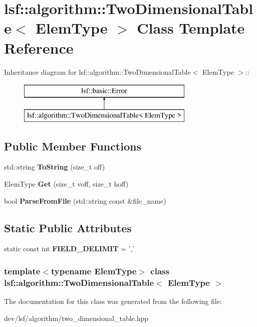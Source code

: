 \hypertarget{classlsf_1_1algorithm_1_1TwoDimensionalTable}{
\section{lsf::algorithm::TwoDimensionalTable$<$ ElemType $>$ Class Template Reference}
\label{classlsf_1_1algorithm_1_1TwoDimensionalTable}
}
Inheritance diagram for lsf::algorithm::TwoDimensionalTable$<$ ElemType $>$::\begin{figure}[H]
\begin{center}
\leavevmode
\includegraphics[height=2cm]{classlsf_1_1algorithm_1_1TwoDimensionalTable}
\end{center}
\end{figure}
\subsection*{Public Member Functions}
\begin{DoxyCompactItemize}
\item 
\hypertarget{classlsf_1_1algorithm_1_1TwoDimensionalTable_a2ece46cd50fcd00b80fb185f793a5c14}{
std::string {\bfseries ToString} (size\_\-t off)}
\label{classlsf_1_1algorithm_1_1TwoDimensionalTable_a2ece46cd50fcd00b80fb185f793a5c14}

\item 
\hypertarget{classlsf_1_1algorithm_1_1TwoDimensionalTable_a73652a341f32e05062318b2ae38a3a19}{
ElemType {\bfseries Get} (size\_\-t voff, size\_\-t hoff)}
\label{classlsf_1_1algorithm_1_1TwoDimensionalTable_a73652a341f32e05062318b2ae38a3a19}

\item 
\hypertarget{classlsf_1_1algorithm_1_1TwoDimensionalTable_ab1ad29890ba054cc75e4914f7feab169}{
bool {\bfseries ParseFromFile} (std::string const \&file\_\-name)}
\label{classlsf_1_1algorithm_1_1TwoDimensionalTable_ab1ad29890ba054cc75e4914f7feab169}

\end{DoxyCompactItemize}
\subsection*{Static Public Attributes}
\begin{DoxyCompactItemize}
\item 
\hypertarget{classlsf_1_1algorithm_1_1TwoDimensionalTable_a2f8a0787f93b6f90909c7d57d891d810}{
static const int {\bfseries FIELD\_\-DELIMIT} = ','}
\label{classlsf_1_1algorithm_1_1TwoDimensionalTable_a2f8a0787f93b6f90909c7d57d891d810}

\end{DoxyCompactItemize}
\subsubsection*{template$<$typename ElemType$>$ class lsf::algorithm::TwoDimensionalTable$<$ ElemType $>$}



The documentation for this class was generated from the following file:\begin{DoxyCompactItemize}
\item 
dev/lsf/algorithm/two\_\-dimensional\_\-table.hpp\end{DoxyCompactItemize}
